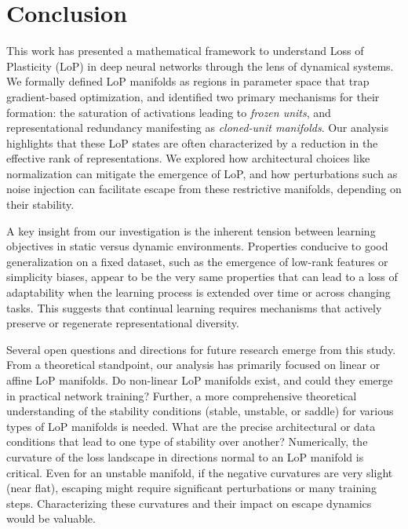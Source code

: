 \documentclass{article}
\newcommand{\AJ}[1]{\todo[color=green!30,size=\tiny]{AJ: #1}}
\newcommand{\GIU}[1]{\todo[color=purple!30,size=\tiny]{GIU: #1}}
\newcommand{\IMZ}[1]{\todo[color=red!30,size=\tiny]{IMAN: #1}}
\numberwithin{figure}{section}
\begin{document}
\section{Conclusion}
\label{sec:discussion}
This work has presented a mathematical framework to understand Loss of Plasticity (LoP) in deep neural networks through the lens of dynamical systems. We formally defined LoP manifolds as regions in parameter space that trap gradient-based optimization, and identified two primary mechanisms for their formation: the saturation of activations leading to \emph{frozen units}, and representational redundancy manifesting as \emph{cloned-unit manifolds}. Our analysis highlights that these LoP states are often characterized by a reduction in the effective rank of representations. We explored how architectural choices like normalization can mitigate the emergence of LoP, and how perturbations such as noise injection can facilitate escape from these restrictive manifolds, depending on their stability.

A key insight from our investigation is the inherent tension between learning objectives in static versus dynamic environments. Properties conducive to good generalization on a fixed dataset, such as the emergence of low-rank features or simplicity biases, appear to be the very same properties that can lead to a loss of adaptability when the learning process is extended over time or across changing tasks. This suggests that continual learning requires mechanisms that actively preserve or regenerate representational diversity.

Several open questions and directions for future research emerge from this study.
From a theoretical standpoint, our analysis has primarily focused on linear or affine LoP manifolds. Do non-linear LoP manifolds exist, and could they emerge in practical network training? Further, a more comprehensive theoretical understanding of the stability conditions (stable, unstable, or saddle) for various types of LoP manifolds is needed. What are the precise architectural or data conditions that lead to one type of stability over another? 
Numerically, the curvature of the loss landscape in directions normal to an LoP manifold is critical. Even for an unstable manifold, if the negative curvatures are very slight (near flat), escaping might require significant perturbations or many training steps. Characterizing these curvatures and their impact on escape dynamics would be valuable.
\end{document}
